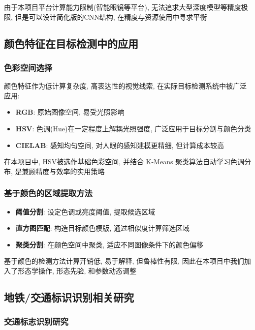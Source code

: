 \documentclass[12pt,a4paper]{article}
\begin{document}
由于本项目平台计算能力限制(智能眼镜等平台), 无法追求大型深度模型等精度极限, 但是可以设计简化版的CNN结构, 在精度与资源使用中寻求平衡

\subsection{颜色特征在目标检测中的应用}

\subsubsection{色彩空间选择}

颜色特征作为低计算复杂度, 高表达性的视觉线索, 在实际目标检测系统中被广泛应用:

\begin{itemize}
    \item \textbf{RGB}: 原始图像空间, 易受光照影响
    \item \textbf{HSV}: 色调(Hue)在一定程度上解耦光照强度, 广泛应用于目标分割与颜色分类
    \item \textbf{CIELAB}: 感知均匀空间, 对人眼的感知建模更精细, 但计算成本较高
\end{itemize}

在本项目中, HSV被选作基础色彩空间, 并结合 K-Means 聚类算法自动学习色调分布, 是兼顾精度与效率的实用策略

\subsubsection{基于颜色的区域提取方法}

\begin{itemize}
    \item \textbf{阈值分割}: 设定色调或亮度阈值, 提取候选区域
    \item \textbf{直方图匹配}: 构造目标颜色模版, 通过相似度计算筛选区域
    \item \textbf{聚类分割}: 在颜色空间中聚类, 适应不同图像条件下的颜色偏移
\end{itemize}

基于颜色的检测方法计算开销低, 易于解释, 但鲁棒性有限, 因此在本项目中我们加入了形态学操作, 形态先验, 和参数动态调整

\subsection{地铁/交通标识识别相关研究}

\subsubsection{交通标志识别研究}
\end{document}
